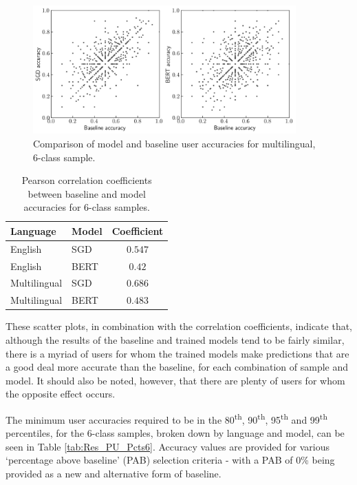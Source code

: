 \begin{figure}[ht]
    \centering
    \includegraphics[width=0.9\textwidth]{figures/06_results/02_pu/04_scatter/any_6.png}
    \caption{Comparison of model and baseline user accuracies for multilingual, 6-class sample.}
    \label{fig:Res_PU_ScatterMul}
\end{figure}

\begin{table}[ht]
    \centering
    \begin{tabular}{l l | c}
        \toprule
        \textbf{Language}&\textbf{Model}&\textbf{Coefficient}\\\midrule
        English&SGD&$0.547$\\
        English&BERT&$0.42$\\\midrule
        Multilingual&SGD&$0.686$\\
        Multilingual&BERT&$0.483$\\
        \bottomrule
    \end{tabular}
    \caption{Pearson correlation coefficients between baseline and model accuracies for 6-class samples.}
    \label{tab:Res_PU_Corrs}
\end{table}

These scatter plots, in combination with the correlation coefficients, indicate that, although the results of the baseline and trained models tend to be fairly similar, there is a myriad of users for whom the trained models make predictions that are a good deal more accurate than the baseline, for each combination of sample and model. It should also be noted, however, that there are plenty of users for whom the opposite effect occurs.

The minimum user accuracies required to be in the 80\textsuperscript{th}, 90\textsuperscript{th}, 95\textsuperscript{th} and 99\textsuperscript{th} percentiles, for the 6-class samples, broken down by language and model, can be seen in Table \ref{tab:Res_PU_Pcts6}. Accuracy values are provided for various `percentage above baseline' (PAB) selection criteria - with a PAB of 0\% being provided as a new and alternative form of baseline.

